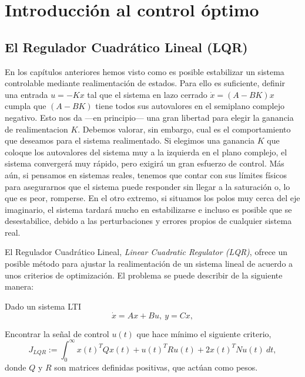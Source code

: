 \chapter{Introducción al control óptimo}
\section{El Regulador Cuadrático Lineal (LQR)}
En los capítulos anteriores hemos visto como es posible estabilizar un sistema controlable mediante realimentación de estados. Para ello es suficiente, definir una entrada $u = -Kx$ tal que el sistema en lazo cerrado $\dot x = (A-BK)x$ cumpla que $(A-BK)$ tiene todos sus autovalores en el semiplano complejo negativo. Esto nos da ---en principio--- una gran libertad para elegir la ganancia de realimentacion $K$. Debemos valorar, sin embargo, cual es el comportamiento que deseamos para el sistema realimentado. Si elegimos una ganancia $K$ que coloque los autovalores del sistema muy a la izquierda en el plano complejo, el sistema convergerá muy rápido, pero exigirá un gran esfuerzo de control. Más aún, si pensamos en sistemas reales, tenemos que contar con sus límites físicos para asegurarnos que el sistema puede responder sin llegar a la saturación o, lo que es peor, romperse. En el otro extremo, si situamos los polos muy cerca del eje imaginario, el sistema tardará mucho en estabilizarse e incluso es posible que se desestabilice, debido a las perturbaciones y errores propios de cualquier sistema real.

El Regulador Cuadrático Lineal, \emph{Linear Cuadratic Regulator (LQR)}, ofrece un posible método para ajustar la realimentación de un sistema lineal de acuerdo a unos criterios de optimización. El problema se puede describir de la siguiente manera:

Dado un sistema LTI
\begin{equation*}
\dot{x} = Ax+Bu,\ y=Cx,
\end{equation*}

Encontrar la señal de control $u(t)$ que hace mínimo el siguiente criterio,
\begin{equation}\label{eq:lqr}
J_{LQR} := \int_0^{\infty}x(t)^TQx(t)+u(t)^TRu(t)+2x(t)^TNu(t)\  dt,
\end{equation}
donde $Q$ y $R$ son matrices definidas positivas, que actúan como pesos.

